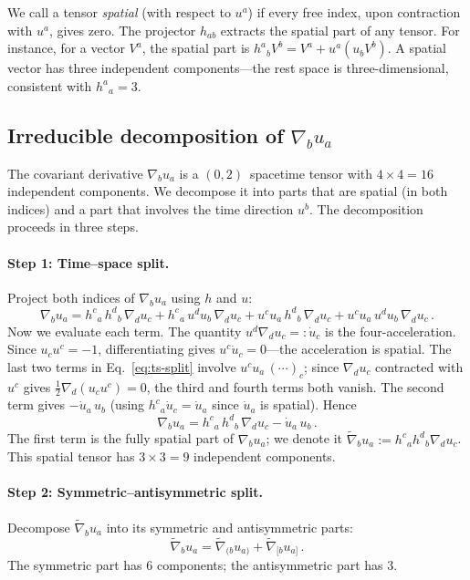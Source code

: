 We call a tensor \emph{spatial} (with respect to $u^a$) if
every free index, upon contraction with $u^a$, gives zero.  The
projector $h_{ab}$ extracts the spatial part of any tensor.  For
instance, for a vector $V^a$, the spatial part is
$h^a{}_b V^b = V^a + u^a(u_b V^b)$.  A spatial vector has
three independent components---the rest space is
three-dimensional, consistent with $h^a{}_a = 3$.


\subsection{Irreducible decomposition of $\nabla_b u_a$}
\label{sec:irred-decomp}

The covariant derivative $\nabla_b u_a$ is a
$(0,2)$~spacetime tensor with $4 \times 4 = 16$ independent
components.  We decompose it into parts that are spatial (in
both indices) and a part that involves the time direction $u^b$.
The decomposition proceeds in three steps.

\paragraph{Step 1: Time--space split.}
Project both indices of $\nabla_b u_a$ using $h$ and $u$:
\begin{equation}\label{eq:ts-split}
\nabla_b u_a
= h^c{}_a\, h^d{}_b\, \nabla_d u_c
  + h^c{}_a\, u^d u_b\, \nabla_d u_c
  + u^c u_a\, h^d{}_b\, \nabla_d u_c
  + u^c u_a\, u^d u_b\, \nabla_d u_c\,.
\end{equation}
Now we evaluate each term.  The quantity
$u^d \nabla_d u_c =: \dot{u}_c$ is the four-acceleration.
Since $u_c u^c = -1$, differentiating gives
$u^c \dot{u}_c = 0$---the acceleration is spatial.  The
last two terms in Eq.~\eqref{eq:ts-split} involve
$u^c u_a \,(\cdots)_c$; since $\nabla_d u_c$ contracted with
$u^c$ gives $\frac{1}{2}\nabla_d(u_c u^c) = 0$, the third and
fourth terms both vanish.  The second term gives
$- \dot{u}_a\, u_b$ (using $h^c{}_a \dot{u}_c = \dot{u}_a$
since $\dot{u}_a$ is spatial).  Hence
\begin{equation}\label{eq:ts-result}
\nabla_b u_a
= h^c{}_a\, h^d{}_b\, \nabla_d u_c
  - \dot{u}_a\, u_b\,.
\end{equation}
The first term is the fully spatial part of $\nabla_b u_a$; we
denote it $\tilde{\nabla}_b u_a := h^c{}_a h^d{}_b \nabla_d u_c$.
This spatial tensor has $3 \times 3 = 9$ independent components.

\paragraph{Step 2: Symmetric--antisymmetric split.}
Decompose $\tilde{\nabla}_b u_a$ into its symmetric and
antisymmetric parts:
\begin{equation}
\tilde{\nabla}_b u_a
= \tilde{\nabla}_{(b} u_{a)}
  + \tilde{\nabla}_{[b} u_{a]}\,.
\end{equation}
The symmetric part has $6$ components; the antisymmetric part
has $3$.

